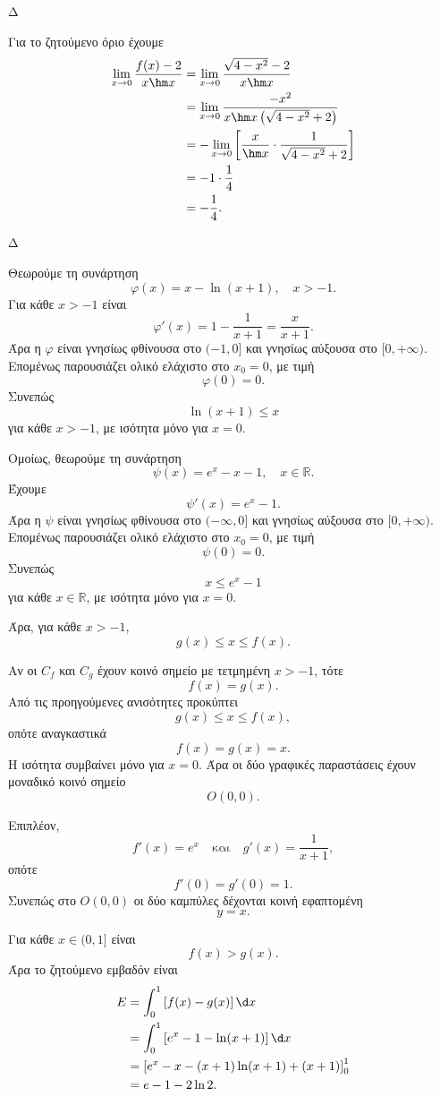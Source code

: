\begin{thema}{Δ}
\begin{erwthma}
Για το ζητούμενο όριο έχουμε
\begin{align*}
\lim_{x\to0}\frac{f(x)-2}{x\hm x}
&=\lim_{x\to0}
\frac{\sqrt{4-x^2}-2}{x\hm x}\\
&=\lim_{x\to0}
\frac{-x^2}
{x\hm x\left(\sqrt{4-x^2}+2\right)}\\
&=-\lim_{x\to0}
\left[
\frac{x}{\hm x}\cdot
\frac{1}{\sqrt{4-x^2}+2}
\right]\\
&=-1\cdot\frac14\\
&={-\frac14}.
\end{align*}
\end{erwthma}
\end{thema}

\begin{thema}{Δ}
\begin{erwthma}
\item Θεωρούμε τη συνάρτηση
\[
\varphi(x)=x-\ln(x+1),\quad x>-1.
\]
Για κάθε $x>-1$ είναι
\[
\varphi'(x)=1-\frac{1}{x+1}=\frac{x}{x+1}.
\]
Άρα η $\varphi$ είναι γνησίως φθίνουσα στο $(-1,0]$ και γνησίως αύξουσα στο $[0,+\infty)$. Επομένως παρουσιάζει ολικό ελάχιστο στο $x_0=0$, με τιμή
\[
\varphi(0)=0.
\]
Συνεπώς
\[
{\ln(x+1)\leq x}
\]
για κάθε $x>-1$, με ισότητα μόνο για $x=0$.

Ομοίως, θεωρούμε τη συνάρτηση
\[
\psi(x)=e^x-x-1,\quad x\in\mathbb{R}.
\]
Έχουμε
\[
\psi'(x)=e^x-1.
\]
Άρα η $\psi$ είναι γνησίως φθίνουσα στο $(-\infty,0]$ και γνησίως αύξουσα στο $[0,+\infty)$. Επομένως παρουσιάζει ολικό ελάχιστο στο $x_0=0$, με τιμή
\[
\psi(0)=0.
\]
Συνεπώς
\[
{x\leq e^x-1}
\]
για κάθε $x\in\mathbb{R}$, με ισότητα μόνο για $x=0$.

Άρα, για κάθε $x>-1$,
\[
{g(x)\leq x\leq f(x)}.
\]

Αν οι $C_f$ και $C_g$ έχουν κοινό σημείο με τετμημένη $x>-1$, τότε
\[
f(x)=g(x).
\]
Από τις προηγούμενες ανισότητες προκύπτει
\[
g(x)\leq x\leq f(x),
\]
οπότε αναγκαστικά
\[
f(x)=g(x)=x.
\]
Η ισότητα συμβαίνει μόνο για $x=0$. Άρα οι δύο γραφικές παραστάσεις έχουν μοναδικό κοινό σημείο
\[
{O(0,0)}.
\]

Επιπλέον,
\[
f'(x)=e^x
\quad\text{και}\quad
g'(x)=\frac{1}{x+1},
\]
οπότε
\[
f'(0)=g'(0)=1.
\]
Συνεπώς στο $O(0,0)$ οι δύο καμπύλες δέχονται κοινή εφαπτομένη
\[
{y=x}.
\]

\item Για κάθε $x\in(0,1]$ είναι
\[
f(x)>g(x).
\]
Άρα το ζητούμενο εμβαδόν είναι
\begin{align*}
E
&=\int_0^1\left[f(x)-g(x)\right]\d x\\
&=\int_0^1\left[e^x-1-\ln(x+1)\right]\d x\\
&=\left[
e^x-x-(x+1)\ln(x+1)+(x+1)
\right]_0^1\\
&={e-1-2\ln2}.
\end{align*}


\end{erwthma}
\end{thema}
